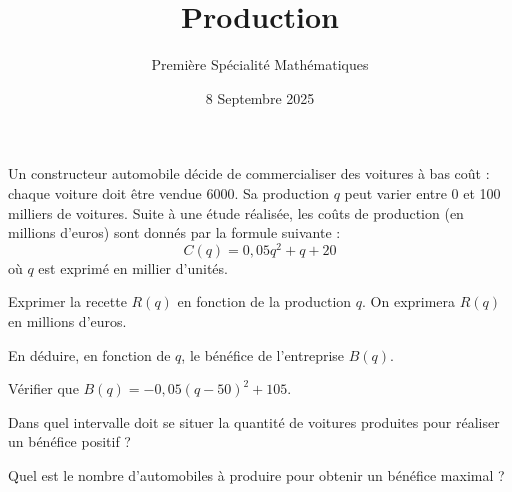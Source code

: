 \documentclass{exos}
\title{Production}
\date{8 Septembre 2025}
\author{Première Spécialité Mathématiques}
\begin{document}
\maketitle

\begin{tcolorbox}
Un constructeur automobile décide de commercialiser des voitures à bas coût : chaque voiture doit être vendue \qty{6000}{}. Sa production $q$ peut varier entre \num{0} et \num{100} milliers de voitures. Suite à une étude réalisée, les coûts de production (en millions d'euros) sont donnés par la formule suivante :
\begin{equation*}
C(q) = 0,05q^2 + q + 20
\end{equation*}
où $q$ est exprimé en millier d'unités.
\end{tcolorbox}
\begin{alphaquestions}
\item Exprimer la recette $R(q)$ en fonction de la production $q$. On exprimera $R(q)$ en millions d'euros.
\item En déduire, en fonction de $q$, le bénéfice de l'entreprise $B(q)$.
\item Vérifier que $B(q) = -0,05(q - 50)^2 + 105$.
\item Dans quel intervalle doit se situer la quantité de voitures produites pour réaliser un bénéfice positif ?
\item Quel est le nombre d'automobiles à produire pour obtenir un bénéfice maximal ?
\end{alphaquestions}
\end{document}
